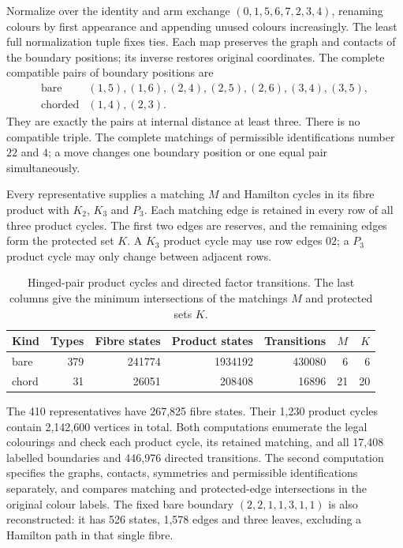 Normalize over the identity and arm exchange $(0,1,5,6,7,2,3,4)$,
renaming colours by first appearance and appending unused colours
increasingly. The least full normalization tuple fixes ties. Each map
preserves the graph and contacts of the boundary positions; its inverse restores original coordinates. The complete compatible pairs of boundary positions are
\[
\begin{array}{cl}
\text{bare}&(1,5),(1,6),(2,4),(2,5),(2,6),(3,4),(3,5),\\
\text{chorded}&(1,4),(2,3).
\end{array}
\]
They are exactly the pairs at internal distance at least three. There
is no compatible triple. The complete matchings of permissible identifications number $22$ and
$4$; a move changes one boundary position or one equal pair simultaneously.

Every representative supplies a matching $M$ and Hamilton cycles in its fibre
product with $K_2$, $K_3$ and $P_3$. Each matching edge is retained in
every row of all three product cycles. The first two edges are reserves,
and the remaining edges form the protected set $K$. A $K_3$ product cycle may use
row edges $02$; a $P_3$ product cycle may only change between adjacent rows.

\begin{table}[htbp]
\centering\small
\caption{Hinged-pair product cycles and directed factor transitions.
The last columns give the minimum intersections of the matchings $M$
and protected sets $K$.}
\label{tab:hinged-pair-counts}
\begin{tabular}{lrrrrrr}
\toprule
Kind & Types & Fibre states & Product states & Transitions & $M$ & $K$\\
\midrule
bare&379&241774&1934192&430080&6&6\\
chord&31&26051&208408&16896&21&20\\
\bottomrule
\end{tabular}
\end{table}

The 410 representatives have 267,825 fibre states. Their 1,230 product
cycles contain 2,142,600 vertices in total. Both computations enumerate
the legal colourings and check each product cycle, its retained matching,
and all 17,408 labelled boundaries and 446,976 directed transitions.
The second computation specifies the graphs, contacts, symmetries and
permissible identifications separately, and compares matching and
protected-edge intersections in the original colour labels.
The fixed bare boundary $(2,2,1,1,3,1,1)$ is also reconstructed: it has
526 states, 1,578 edges and three leaves, excluding a Hamilton path
in that single fibre.

